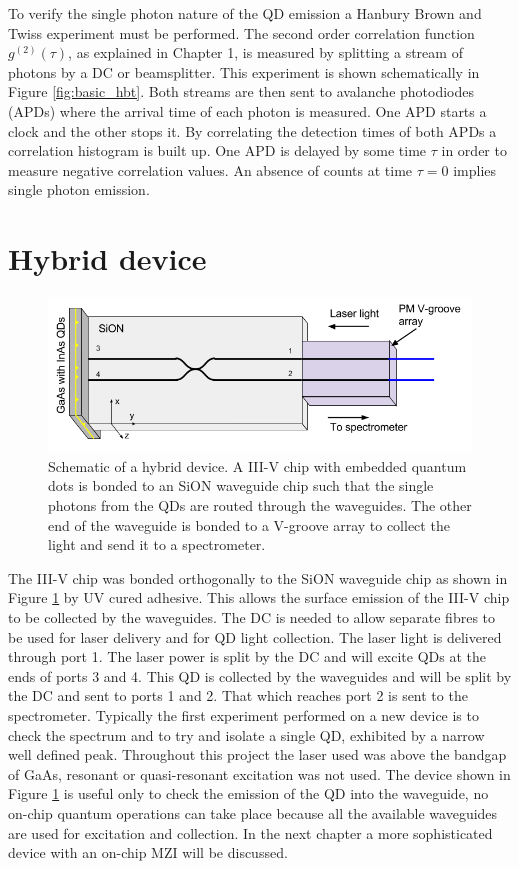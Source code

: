 To verify the single photon nature of the QD emission a Hanbury Brown and Twiss
experiment must be performed. The second order correlation function
$g^{(2)}(\tau)$, as explained in Chapter 1, is measured by splitting a stream of
photons by a DC or beamsplitter. This experiment is shown schematically in
Figure \ref{fig:basic_hbt}.  Both streams are then sent to avalanche photodiodes
(APDs) where the arrival time of each photon is measured. One APD starts a clock
and the other stops it. By correlating the detection times of both APDs a correlation
histogram is built up. One APD is delayed by some time $\tau$ in order to
measure negative correlation values. An absence of counts at time $\tau = 0$
implies single photon emission.

\section{Hybrid device}

\begin{figure}[h!] \begin{center}
\includegraphics[width=1\textwidth]{images/hyb_basic.png} \caption{
Schematic of a hybrid device. A III-V chip with embedded quantum dots is bonded
to an SiON waveguide chip such that the single photons from the QDs are routed
through the waveguides. The other end of the waveguide is bonded to a V-groove
array to collect the light and send it to a spectrometer.
} \label{fig:hyb_basic} \end{center} \end{figure}

The III-V chip was bonded orthogonally to the SiON waveguide chip as shown in
Figure \ref{fig:hyb_basic} by UV cured adhesive. This allows the surface
emission of the III-V chip to be collected by the waveguides. The DC is needed
to allow separate fibres to be used for laser delivery and for QD light collection. The
laser light is delivered through port 1. The laser power is split by the DC and
will excite QDs at the ends of ports 3 and 4. This QD is collected by the
waveguides and will be split by the DC and sent to ports 1 and 2. That which
reaches port 2 is sent to the spectrometer. Typically the first experiment
performed on a new device is to check the spectrum and  to try and isolate a
single QD, exhibited by a narrow well defined peak. Throughout this project the
laser used was above the bandgap of GaAs, resonant or quasi-resonant excitation
was not used. The device shown in Figure \ref{fig:hyb_basic} is useful only to
check the emission of the QD into the waveguide, no on-chip quantum operations
can take place because all the available waveguides are used for excitation and
collection. In the next chapter a more sophisticated device with an on-chip MZI
will be discussed.

